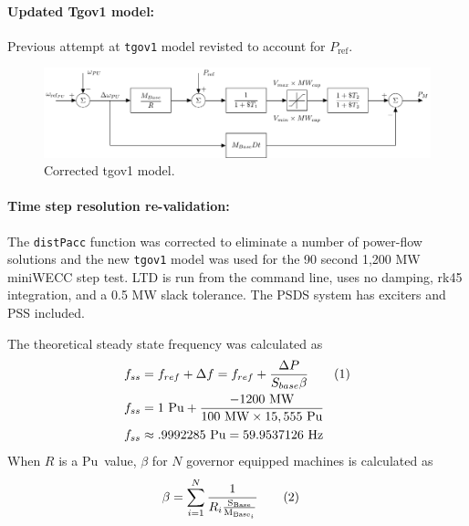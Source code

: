 \documentclass[12pt]{article}
\newcommand\numberthis{\addtocounter{equation}{1}\tag{\theequation}} %
\begin{document}
\paragraph{Updated Tgov1 model:} Previous attempt at \verb|tgov1| model revisted to account for $P_{\text{ref}}$.
	\begin{figure}[h!]
			\centering
			\includegraphics[width=\linewidth]{tgov1}\vspace{-.5em}
			\caption{Corrected tgov1 model.}
			\label{tgov1}		 
	\end{figure}\vspace{-.5em}
\vspace{-1em}

\paragraph{Time step resolution re-validation:} The \verb|distPacc| function was corrected to eliminate a number of power-flow solutions and the new \verb|tgov1| model was used for the 90 second 1,200 MW miniWECC step test.
LTD is run from the command line, uses no damping, rk45 integration, and a 0.5 MW slack tolerance.
The PSDS system has exciters and PSS included.

\newcommand{\mw}{\ensuremath{\text{ MW}}}
\newcommand{\hz}{\ensuremath{\text{ Hz}}}
\newcommand{\pu}{\ensuremath{\text{ Pu}}}
\newcommand{\sbase}{\ensuremath{\text{S}_{\text{Base}}}}
\newcommand{\fbase}{\ensuremath{f_{\text{Base}}}}
\newcommand{\mbase}[1]{\ensuremath{\text{M}_{\text{Base}_{#1}}}}
\newcommand{\hsys}{\ensuremath{\text{ H}_{\text{sys}}}}

The theoretical steady state frequency was calculated as
\begin{align*}
f_{ss} &= f_{ref}+\Delta f = f_{ref} + \frac{\Delta P}{S_{base}\beta} \numberthis \\
f_{ss} &= 1\pu + \frac{-1200\mw}{100\mw \times 15,555\pu} \\
f_{ss} &\approx .9992285\pu = 59.9537126\hz 
\end{align*}
When $R$ is a\pu\ value, $\beta$ for $N$ governor equipped machines is calculated as
\begin{align*}
\beta &= \sum_{i=1}^{N} \dfrac{1}{R_i \frac{\sbase}{\mbase{i}}}\numberthis
\end{align*}
\end{document}
